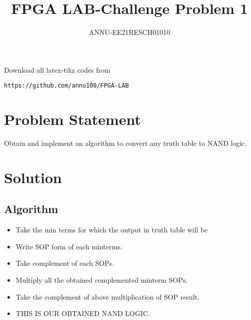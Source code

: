 \documentclass{article}
\begin{document}
     \def\rightbox#1{\makebox[0in][r]{#1}}
     \def\centbox#1{\makebox[0in]{#1}}
     \def\topbox#1{\raisebox{-\baselineskip}[0in][0in]{#1}}
     \def\midbox#1{\raisebox{-0.5\baselineskip}[0in][0in]{#1}}
\vspace{3cm}
\title{FPGA LAB-Challenge Problem 1}
\author{ANNU-EE21RESCH01010}
\date{}
\maketitle
\renewcommand\thefigure{\arabic{figure}}
\setcounter{figure}{0}
\renewcommand{\thetable}{\arabic{table}}
\setcounter{table}{0}
Download all latex-tikz codes from 
%
\begin{lstlisting}
https://github.com/annu100/FPGA-LAB
\end{lstlisting}
%
\section{Problem Statement}
Obtain and implement an algorithm to convert any truth table to NAND logic.
\section{Solution}
\subsection{Algorithm}
\begin{itemize}
\item Take the min terms for which the output in truth table will be \item  Write SOP form of each minterms.
\item Take complement of each SOPs.
\item Multiply all the obtained complemented minterm SOPs.
\item Take the complement of above multiplication of SOP result.
\item THIS IS OUR OBTAINED NAND LOGIC.
\end{itemize}
\end{document}
